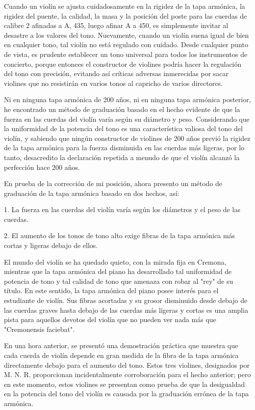 \documentclass[12pt]{book}
\begin{document}
Cuando un violín se ajusta cuidadosamente en la rigidez de la tapa armónica, la rigidez del puente, la calidad, la masa y la posición del poste para las cuerdas de calibre 2 afinadas a A, 435, luego afinar A a 450, es simplemente invitar al desastre a los valores del tono. Nuevamente, cuando un violín suena igual de bien en cualquier tono, tal violín no está regulado con cuidado. Desde cualquier punto de vista, es prudente establecer un tono universal para todos los instrumentos de concierto, porque entonces el constructor de violines podría hacer la regulación del tono con precisión, evitando así críticas adversas inmerecidas por sacar violines que no resistirán en varios tonos al capricho de varios directores.

Ni en ninguna tapa armónica de 200 años, ni en ninguna tapa armónica posterior, he encontrado un método de graduación basado en el hecho evidente de que la fuerza en las cuerdas del violín varía según su diámetro y peso. Considerando que la uniformidad de la potencia del tono es una característica valiosa del tono del violín, y sabiendo que ningún constructor de violines de 200 años previó la rigidez de la tapa armónica para la fuerza disminuida en las cuerdas más ligeras, por lo tanto, desacredito la declaración repetida a menudo de que el violín alcanzó la perfección hace 200 años.

En prueba de la corrección de mi posición, ahora presento un método de graduación de la tapa armónica basado en dos hechos, así:

1. La fuerza en las cuerdas del violín varía según los diámetros y el peso de las cuerdas.

2. El aumento de los tonos de tono alto exige fibras de la tapa armónica más cortas y ligeras debajo de ellos.

El mundo del violín se ha quedado quieto, con la mirada fija en Cremona, mientras que la tapa armónica del piano ha desarrollado tal uniformidad de potencia de tono y tal calidad de tono que amenaza con robar al "rey" de su título. En este sentido, la tapa armónica del piano posee interés para el estudiante de violín. Sus fibras acortadas y su grosor disminuido desde debajo de las cuerdas graves hasta debajo de las cuerdas más ligeras y cortas es una amplia pista para aquellos devotos del violín que no pueden ver nada más que "Cremonensis faciebat".

En una hora anterior, se presentó una demostración práctica que muestra que cada cuerda de violín depende en gran medida de la fibra de la tapa armónica directamente debajo para el aumento del tono. Estos tres violines, designados por M. N. R. proporcionan incidentalmente corroboración para el hecho anterior; pero en este momento, estos violines se presentan como prueba de que la desigualdad en la potencia del tono del violín es causada por la graduación errónea de la tapa armónica.
\end{document}
